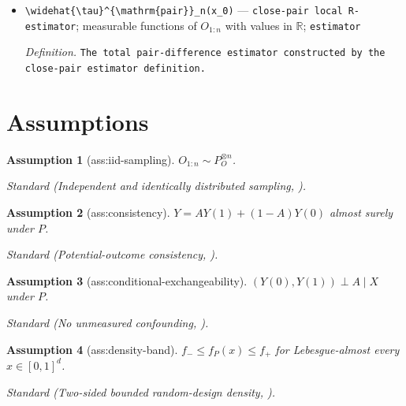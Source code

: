 \documentclass{article}
\newtheorem{assumption}{Assumption}
\begin{document}
\begin{itemize}
  \par\smallskip\noindent\emph{Definition.} \texttt{The band-\allowbreak{}only close-\allowbreak{}pair region constructed by the close-\allowbreak{}pair-\allowbreak{}region definition.}
  \item \texttt{\textbackslash{}\allowbreak{}widehat\{\textbackslash{}\allowbreak{}tau\}\allowbreak{}\textasciicircum{}\{\textbackslash{}\allowbreak{}mathrm\{pair\}\allowbreak{}\}\allowbreak{}\_\allowbreak{}n(x\_\allowbreak{}0)} --- \texttt{close-\allowbreak{}pair local R-\allowbreak{}estimator}; measurable functions of \(O_{1:n}\) with values in \(\mathbb R\); \texttt{estimator}
  \par\smallskip\noindent\emph{Definition.} \texttt{The total pair-\allowbreak{}difference estimator constructed by the close-\allowbreak{}pair estimator definition.}
\end{itemize}

\section{Assumptions}

\begin{assumption}[ass:iid-sampling]\label{ass:iid-sampling}
\(O_{1:n}\sim P_O^{\otimes n}\).
\par\smallskip\noindent\emph{Standard} (Independent and identically distributed sampling, \cite{KennedyBalakrishnanRobinsWasserman2024MinimaxCATE}).
\end{assumption}

\begin{assumption}[ass:consistency]\label{ass:consistency}
\(Y=A Y(1)+(1-A)Y(0)\) almost surely under \(P\).
\par\smallskip\noindent\emph{Standard} (Potential-outcome consistency, \cite{KennedyBalakrishnanRobinsWasserman2024MinimaxCATE}).
\end{assumption}

\begin{assumption}[ass:conditional-exchangeability]\label{ass:conditional-exchangeability}
\((Y(0),Y(1))\perp A\mid X\) under \(P\).
\par\smallskip\noindent\emph{Standard} (No unmeasured confounding, \cite{KennedyBalakrishnanRobinsWasserman2024MinimaxCATE}).
\end{assumption}

\begin{assumption}[ass:density-band]\label{ass:density-band}
\(f_{-}\le f_P(x)\le f_{+}\) for Lebesgue-almost every \(x\in[0,1]^d\).
\par\smallskip\noindent\emph{Standard} (Two-sided bounded random-design density, \cite{LiuMukherjeeNeweyRobins2017EmpiricalHOIF}).
\end{assumption}
\end{document}
